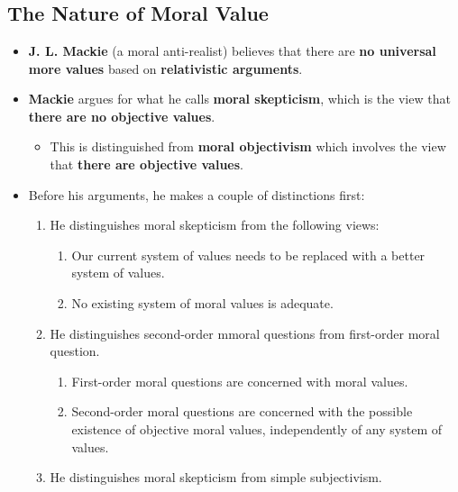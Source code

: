 \documentclass{article}
\begin{document}
    \section*{}

    \subsection*{The Nature of Moral Value}
    \begin{itemize}
        \item \textbf{J. L. Mackie} (a moral anti-realist) believes that there are \textbf{no universal more values} based on \textbf{relativistic arguments}.
        \item \textbf{Mackie} argues for what he calls \textbf{moral skepticism}, which is the view that \textbf{there are no objective values}.
        \begin{itemize}
            \item This is distinguished from \textbf{moral objectivism} which involves  the view that \textbf{there are objective values}.
        \end{itemize}
        \item Before his arguments, he makes a couple of distinctions first:
        \begin{enumerate}
            \item He distinguishes moral skepticism from the following views:
            \begin{enumerate}
                \item Our current system of values needs to be replaced with a better system of values.
                \item No existing system of moral values is adequate.
            \end{enumerate}
            \item He distinguishes second-order mmoral questions from first-order moral question.
            \begin{enumerate}
                \item First-order moral questions are concerned with moral values.
                \item Second-order moral questions are concerned with the possible existence of objective moral values, independently of any system of values.
            \end{enumerate}
            \item He distinguishes moral skepticism from simple subjectivism.

\end{enumerate}
\end{itemize}
\end{document}
